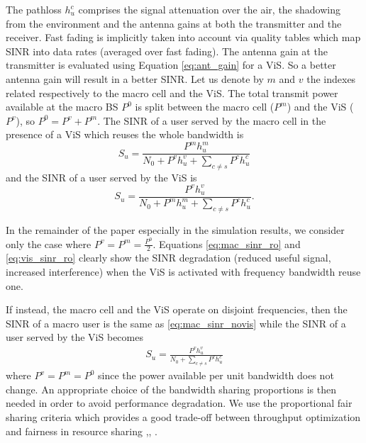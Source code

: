 \documentclass[conference]{IEEEtran}
\begin{document}
	The pathloss $h_u^c$ comprises the signal attenuation over the air, the shadowing from the environment and the antenna gains at both the transmitter and the receiver. Fast fading is implicitly taken into account via quality tables which map \ac{SINR} into data rates (averaged over fast fading). The antenna gain at the transmitter is evaluated using Equation \eqref{eq:ant_gain} for a \ac{ViS}. So a better antenna gain will result in a better \ac{SINR}. Let us denote by $m$ and $v$ the indexes related respectively to the macro cell and the \ac{ViS}. The total transmit power available at the macro \ac{BS} $P^0$ is split between the macro cell ($P^m$) and the \ac{ViS} ($P^v$), so $P^0=P^v+P^m$. The \ac{SINR} of a user served by the macro cell in the presence of a \ac{ViS} which reuses the whole bandwidth is
	\begin{equation} \label{eq:mac_sinr_ro}
		S_u = \frac{P^m h_u^m}{N_0 + P^v h_u^v + \sum_{c \neq s} P^c h_u^c}
	\end{equation}
	and the \ac{SINR} of a user served by the \ac{ViS} is
	\begin{equation}\label{eq:vis_sinr_ro}
		S_u = \frac{P^v h_u^v}{N_0 + P^m h_u^m + \sum_{c \neq s} P^c h_u^c}.
	\end{equation}

	In the remainder of the paper especially in the simulation results, we consider only the case where $P^v = P^m = \frac{P^0}{2}$. Equations \eqref{eq:mac_sinr_ro} and \eqref{eq:vis_sinr_ro} clearly show the \ac{SINR} degradation (reduced useful signal, increased interference) when the \ac{ViS} is activated with frequency bandwidth reuse one.

	If instead, the macro cell and the \ac{ViS} operate on disjoint frequencies, then the \ac{SINR} of a macro user is the same as \eqref{eq:mac_sinr_novis} while the \ac{SINR} of a user served by the \ac{ViS} becomes
	\begin{align}
		S_u = \frac{P^v h_u^v}{N_0 + \sum_{c \neq s} P^c h_u^c}
	\end{align}
	where $P^v=P^m=P^0$ since the power available per unit bandwidth does not change. An appropriate choice of the bandwidth sharing proportions is then needed in order to avoid performance degradation. We use the proportional fair sharing criteria which provides a good trade-off between throughput optimization and fairness in resource sharing \cite{bonald_queueinganalysismax_2006},\cite{kushner_convergenceproportionalfair_2004}, \cite{tall_selforganizingstrategies_2014}.
\end{document}
